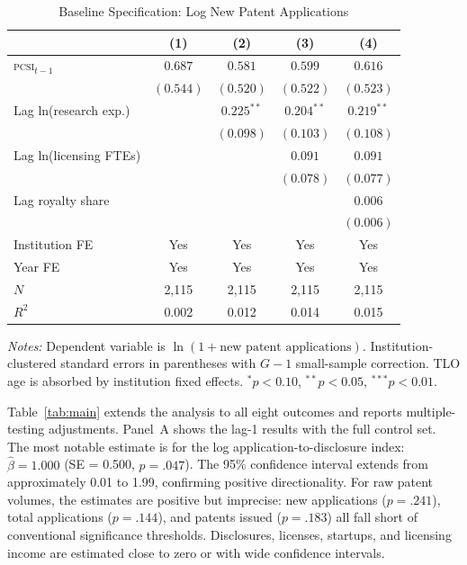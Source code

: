 \documentclass[12pt]{article}
\newcommand{\PCSI}{\textsc{pcsi}}
\begin{document}
\begin{table}[htbp]
\centering
\caption{Baseline Specification: Log New Patent Applications}
\label{tab:baseline}
\begin{threeparttable}
\begin{tabular}{lcccc}
\toprule
 & (1) & (2) & (3) & (4) \\
\midrule
\PCSI{}$_{t-1}$ & $0.687$ & $0.581$ & $0.599$ & $0.616$ \\
 & $(0.544)$ & $(0.520)$ & $(0.522)$ & $(0.523)$ \\[4pt]
Lag ln(research exp.) & & $0.225^{**}$ & $0.204^{**}$ & $0.219^{**}$ \\
 & & $(0.098)$ & $(0.103)$ & $(0.108)$ \\[4pt]
Lag ln(licensing FTEs) & & & $0.091$ & $0.091$ \\
 & & & $(0.078)$ & $(0.077)$ \\[4pt]
Lag royalty share & & & & $0.006$ \\
 & & & & $(0.006)$ \\
\midrule
Institution FE & Yes & Yes & Yes & Yes \\
Year FE & Yes & Yes & Yes & Yes \\
$N$ & 2,115 & 2,115 & 2,115 & 2,115 \\
$R^2$ & 0.002 & 0.012 & 0.014 & 0.015 \\
\bottomrule
\end{tabular}
\begin{tablenotes}
\small
\item \textit{Notes:} Dependent variable is $\ln(1+\text{new patent applications})$.
Institution-clustered standard errors in parentheses with \citet{cameron2015} $G-1$
small-sample correction. TLO age is absorbed by institution fixed effects.
$^*p<0.10$, $^{**}p<0.05$, $^{***}p<0.01$.
\end{tablenotes}
\end{threeparttable}
\end{table}

Table~\ref{tab:main} extends the analysis to all eight outcomes and reports multiple-testing
adjustments. Panel~A shows the lag-1 results with the full control set. The most notable
estimate is for the log application-to-disclosure index: $\hat\beta = 1.000$
(SE = 0.500, $p = .047$). The 95\% confidence interval extends from approximately 0.01
to 1.99, confirming positive directionality. For raw patent volumes, the estimates are
positive but imprecise: new applications ($p = .241$), total applications ($p = .144$),
and patents issued ($p = .183$) all fall short of conventional significance thresholds.
Disclosures, licenses, startups, and licensing income are estimated close to zero or
with wide confidence intervals.
\end{document}

